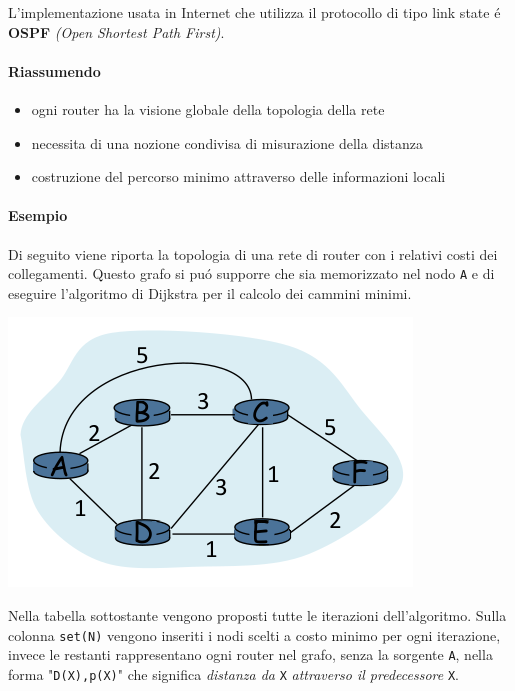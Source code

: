 \documentclass[12pt]{article}
\def\code#1{\texttt{#1}}
\begin{document}
L'implementazione usata in Internet che utilizza il protocollo di tipo link state \'e \textbf{OSPF} \textit{(Open Shortest 
Path First)}.

\paragraph{Riassumendo}\label{router-distribuzione-tabelle-routing-link-state-routing-riassumendo}
\begin{itemize}[noitemsep]
	\item ogni router ha la visione globale della topologia della rete
	\item necessita di una nozione condivisa di misurazione della distanza
	\item costruzione del percorso minimo attraverso delle informazioni locali
\end{itemize}

\clearpage
\paragraph{Esempio}\label{router-distribuzione-tabelle-routing-dijkstra-esempio}
Di seguito viene riporta la topologia di una rete di router con i relativi costi dei collegamenti. Questo grafo si pu\'o 
supporre che sia memorizzato nel nodo \code{A} e di eseguire l'algoritmo di Dijkstra per il calcolo dei cammini minimi.
\begin{center}
	\includegraphics[scale=0.6]{livello_di_rete-img14.png} %
\end{center}
Nella tabella sottostante vengono proposti tutte le iterazioni dell'algoritmo. Sulla colonna \code{set(N)} vengono inseriti i 
nodi scelti a costo minimo per ogni iterazione, invece le restanti rappresentano ogni router nel grafo, senza la sorgente 
\code{A}, nella forma "\code{D(X),p(X)}" che significa \textit{distanza da} \code{X} \textit{attraverso il predecessore} 
\code{X}.
\end{document}
